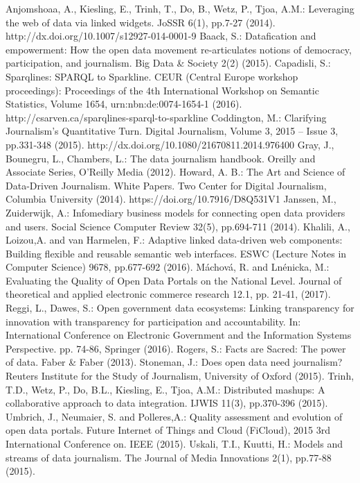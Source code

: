 \documentclass[runningheads,a4paper]{llncs}
\begin{document}
\begin{thebibliography}{4}

 Anjomshoaa, A., Kiesling, E., Trinh, T., Do, B., Wetz, P., Tjoa, A.M.: Leveraging the web of data via linked widgets. JoSSR 6(1), pp.7-27 (2014). http://dx.doi.org/10.1007/s12927-014-0001-9 
 Baack, S.: Datafication and empowerment: How the open data movement re-articulates notions of democracy, participation, and journalism. Big Data \& Society 2(2) (2015).
 Capadisli, S.: Sparqlines: SPARQL to Sparkline. CEUR (Central Europe workshop proceedings): Proceedings of the 4th International Workshop on Semantic Statistics, Volume 1654, urn:nbn:de:0074-1654-1 (2016). http://csarven.ca/sparqlines-sparql-to-sparkline
 Coddington, M.: Clarifying Journalism's Quantitative Turn. Digital Journalism, Volume 3, 2015 -- Issue 3, pp.331-348 (2015). http://dx.doi.org/10.1080/21670811.2014.976400
 Gray, J., Bounegru, L., Chambers, L.: The data journalism handbook. Oreilly and Associate Series, O'Reilly Media (2012).
 Howard, A. B.: The Art and Science of Data-Driven Journalism. White Papers. Two Center for Digital Journalism, Columbia University (2014). https://doi.org/10.7916/D8Q531V1
 Janssen, M., Zuiderwijk, A.: Infomediary business models for connecting open data providers and users. Social Science Computer Review 32(5), pp.694-711 (2014).
 Khalili, A., Loizou,A. and van Harmelen, F.: Adaptive linked data-driven web components: Building flexible and reusable semantic web interfaces. ESWC (Lecture Notes in Computer Science) 9678, pp.677-692 (2016).
 M\'achov\'a, R. and Ln\'enicka, M.: Evaluating the Quality of Open Data Portals on the National Level. Journal of theoretical and applied electronic commerce research 12.1, pp. 21-41, (2017).
 Reggi, L., Dawes, S.: Open government data ecosystems: Linking transparency for innovation with transparency for participation and accountability. In: International Conference on Electronic Government and the Information Systems Perspective. pp. 74-86, Springer (2016).
 Rogers, S.: Facts are Sacred: The power of data. Faber \& Faber (2013).
 Stoneman, J.: Does open data need journalism? Reuters Institute for the Study of Journalism, University of Oxford (2015).
 Trinh, T.D., Wetz, P., Do, B.L., Kiesling, E., Tjoa, A.M.: Distributed mashups: A collaborative approach to data integration. IJWIS 11(3), pp.370-396 (2015).
 Umbrich, J., Neumaier, S. and Polleres,A.: Quality assessment and evolution of open data portals. Future Internet of Things and Cloud (FiCloud), 2015 3rd International Conference on. IEEE (2015).
 Uskali, T.I., Kuutti, H.: Models and streams of data journalism. The Journal of Media Innovations 2(1), pp.77-88 (2015).

\end{thebibliography}
\end{document}
